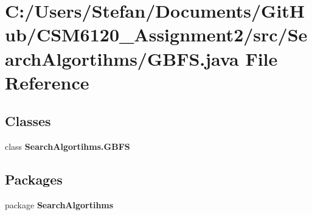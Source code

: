 \section{C\+:/\+Users/\+Stefan/\+Documents/\+Git\+Hub/\+C\+S\+M6120\+\_\+\+Assignment2/src/\+Search\+Algortihms/\+G\+B\+F\+S.java File Reference}
\label{_g_b_f_s_8java}
\subsection*{Classes}
\begin{DoxyCompactItemize}
\item 
class {\bf Search\+Algortihms.\+G\+B\+F\+S}
\end{DoxyCompactItemize}
\subsection*{Packages}
\begin{DoxyCompactItemize}
\item 
package {\bf Search\+Algortihms}
\end{DoxyCompactItemize}
